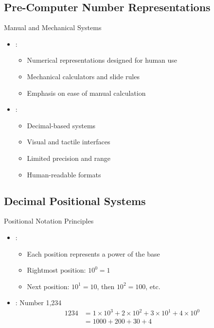\subsection{Pre-Computer Number Representations}

\begin{frame}{Manual and Mechanical Systems}
\begin{itemize}
\item {}:
\begin{itemize}
\item Numerical representations designed for human use
\item Mechanical calculators and slide rules
\item Emphasis on ease of manual calculation
\end{itemize}
\vspace{0.5cm}
\item {}:
\begin{itemize}
\item Decimal-based systems
\item Visual and tactile interfaces
\item Limited precision and range
\item Human-readable formats
\end{itemize}
\end{itemize}
\end{frame}

\subsection{Decimal Positional Systems}

\begin{frame}{Positional Notation Principles}
\begin{itemize}
\item {}:
\begin{itemize}
\item Each position represents a power of the base
\item Rightmost position: $10^0 = 1$
\item Next position: $10^1 = 10$, then $10^2 = 100$, etc.
\end{itemize}
\vspace{0.5cm}
\item {}: Number 1,234
\begin{align}
1234 &= 1 \times 10^3 + 2 \times 10^2 + 3 \times 10^1 + 4 \times 10^0\\
&= 1000 + 200 + 30 + 4
\end{align}
\end{itemize}
\end{frame}

